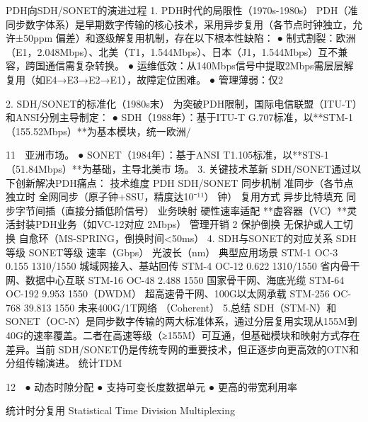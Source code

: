 PDH向SDH/SONET的演进过程
1. PDH时代的局限性（1970s-1980s）
PDH（准同步数字体系）是早期数字传输的核心技术，采用异步复用（各节点时钟独立，允许±50ppm
偏差）和逐级解复用机制，存在以下根本性缺陷：
  ● 制式割裂：欧洲（E1，2.048Mbps）、北美（T1，1.544Mbps）、日本（J1，1.544Mbps）互不兼
    容，跨国通信需复杂转换。
  ● 运维低效：从140Mbps信号中提取2Mbps需层层解复用（如E4→E3→E2→E1），故障定位困难。
  ● 管理薄弱：仅2%

2. SDH/SONET的标准化（1980s末）
为突破PDH限制，国际电信联盟（ITU-T）和ANSI分别主导制定：
  ● SDH（1988年）：基于ITU-T G.707标准，以**STM-1（155.52Mbps）**为基本模块，统一欧洲/


                                                               11
    亚洲市场。
  ● SONET（1984年）：基于ANSI T1.105标准，以**STS-1（51.84Mbps）**为基础，主导北美市
    场。
3. 关键技术革新
SDH/SONET通过以下创新解决PDH痛点：
 技术维度 PDH                      SDH/SONET
 同步机制 准同步（各节点独立时 全网同步（原子钟+SSU，精度达10⁻¹¹）
            钟）
 复用方式 异步比特填充                   同步字节间插（直接分插低阶信号）
 业务映射 硬性速率适配                   **虚容器（VC）**灵活封装PDH业务（如VC-12对应
                               2Mbps）
 管理开销 2%
 保护倒换 无保护或人工切换                 自愈环（MS-SPRING，倒换时间<50ms）
4. SDH与SONET的对应关系
 SDH等级 SONET等级 速率（Gbps）        光波长（nm）      典型应用场景
 STM-1 OC-3       0.155        1310/1550    城域网接入、基站回传
 STM-4 OC-12      0.622        1310/1550    省内骨干网、数据中心互联
 STM-16 OC-48     2.488        1550         国家骨干网、海底光缆
 STM-64 OC-192    9.953        1550（DWDM）   超高速骨干网、100G以太网承载
 STM-256 OC-768   39.813       1550         未来400G/1T网络
                               （Coherent）
 5.总结
SDH（STM-N）和SONET（OC-N）是同步数字传输的两大标准体系，通过分层复用实现从155M到
40G的速率覆盖。二者在高速等级（≥155M）可互通，但基础模块和映射方式存在差异。当前
SDH/SONET仍是传统专网的重要技术，但正逐步向更高效的OTN和分组传输演进。
统计TDM

                                                                  12
 ● 动态时隙分配
 ● 支持可变长度数据单元
 ● 更高的带宽利用率

统计时分复用 Statistical Time Division Multiplexing




